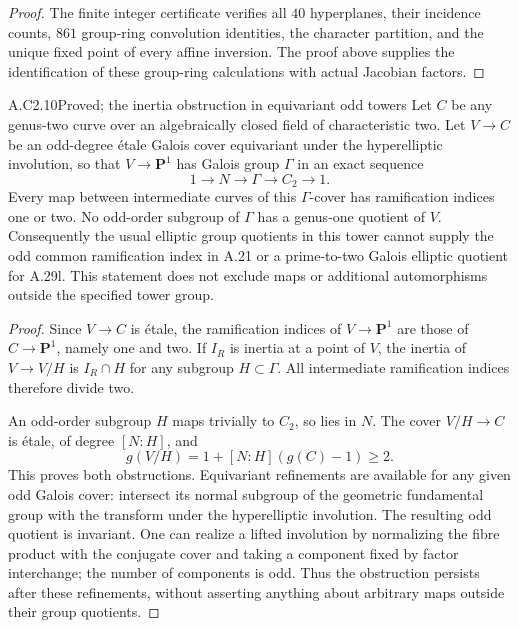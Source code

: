 \begin{proof}
The finite integer certificate
 verifies all $40$
hyperplanes, their incidence counts, $861$ group-ring convolution
identities, the character partition, and the unique fixed point of
every affine inversion. The proof above supplies the identification
of these group-ring calculations with actual Jacobian factors.
\end{proof}

\begin{claim}{A.C2.10}{Proved; the inertia obstruction in equivariant odd towers}
Let $C$ be any genus-two curve over an algebraically closed field
of characteristic two. Let $V\to C$ be an odd-degree \'etale
Galois cover equivariant under the hyperelliptic involution, so
that $V\to\mathbf P^1$ has Galois group $\Gamma$ in an exact
sequence
\[
             1\longrightarrow N\longrightarrow\Gamma
               \longrightarrow C_2\longrightarrow1.
\]
Every map between intermediate curves of this $\Gamma$-cover
has ramification indices one or two. No odd-order subgroup of
$\Gamma$ has a genus-one quotient of $V$. Consequently the
usual elliptic group quotients in this tower cannot supply the
odd common ramification index in A.21 or a prime-to-two Galois
elliptic quotient for A.29l. This statement does not exclude maps
or additional automorphisms outside the specified tower group.
\end{claim}
\begin{proof}
Since $V\to C$ is \'etale, the ramification indices of
$V\to\mathbf P^1$ are those of $C\to\mathbf P^1$, namely
one and two. If $I_R$ is inertia at a point of $V$, the inertia
of $V\to V/H$ is $I_R\cap H$ for any subgroup $H\subset\Gamma$.
All intermediate ramification indices therefore divide two.

An odd-order subgroup $H$ maps trivially to $C_2$, so lies in
$N$. The cover $V/H\to C$ is \'etale, of degree $[N:H]$, and
\[
                 g(V/H)=1+[N:H](g(C)-1)\ge2.
\]
This proves both obstructions. Equivariant refinements are available
for any given odd Galois cover: intersect its normal subgroup of
the geometric fundamental group with the transform under the
hyperelliptic involution. The resulting odd quotient is invariant.
One can realize a lifted involution by normalizing the fibre product
with the conjugate cover and taking a component fixed by factor
interchange; the number of components is odd. Thus the obstruction
persists after these refinements, without asserting anything about
arbitrary maps outside their group quotients.
\end{proof}

